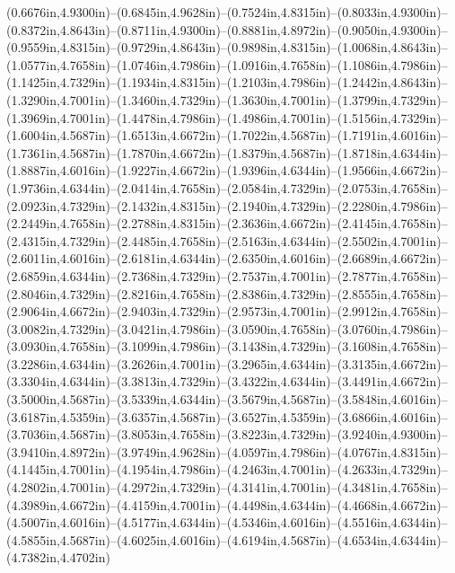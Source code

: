 (0.6676in,4.9300in)--(0.6845in,4.9628in)--(0.7524in,4.8315in)--(0.8033in,4.9300in)--(0.8372in,4.8643in)--(0.8711in,4.9300in)--(0.8881in,4.8972in)--(0.9050in,4.9300in)--(0.9559in,4.8315in)--(0.9729in,4.8643in)--(0.9898in,4.8315in)--(1.0068in,4.8643in)--(1.0577in,4.7658in)--(1.0746in,4.7986in)--(1.0916in,4.7658in)--(1.1086in,4.7986in)--(1.1425in,4.7329in)--(1.1934in,4.8315in)--(1.2103in,4.7986in)--(1.2442in,4.8643in)--(1.3290in,4.7001in)--(1.3460in,4.7329in)--(1.3630in,4.7001in)--(1.3799in,4.7329in)--(1.3969in,4.7001in)--(1.4478in,4.7986in)--(1.4986in,4.7001in)--(1.5156in,4.7329in)--(1.6004in,4.5687in)--(1.6513in,4.6672in)--(1.7022in,4.5687in)--(1.7191in,4.6016in)--(1.7361in,4.5687in)--(1.7870in,4.6672in)--(1.8379in,4.5687in)--(1.8718in,4.6344in)--(1.8887in,4.6016in)--(1.9227in,4.6672in)--(1.9396in,4.6344in)--(1.9566in,4.6672in)--(1.9736in,4.6344in)--(2.0414in,4.7658in)--(2.0584in,4.7329in)--(2.0753in,4.7658in)--(2.0923in,4.7329in)--(2.1432in,4.8315in)--(2.1940in,4.7329in)--(2.2280in,4.7986in)--(2.2449in,4.7658in)--(2.2788in,4.8315in)--(2.3636in,4.6672in)--(2.4145in,4.7658in)--(2.4315in,4.7329in)--(2.4485in,4.7658in)--(2.5163in,4.6344in)--(2.5502in,4.7001in)--(2.6011in,4.6016in)--(2.6181in,4.6344in)--(2.6350in,4.6016in)--(2.6689in,4.6672in)--(2.6859in,4.6344in)--(2.7368in,4.7329in)--(2.7537in,4.7001in)--(2.7877in,4.7658in)--(2.8046in,4.7329in)--(2.8216in,4.7658in)--(2.8386in,4.7329in)--(2.8555in,4.7658in)--(2.9064in,4.6672in)--(2.9403in,4.7329in)--(2.9573in,4.7001in)--(2.9912in,4.7658in)--(3.0082in,4.7329in)--(3.0421in,4.7986in)--(3.0590in,4.7658in)--(3.0760in,4.7986in)--(3.0930in,4.7658in)--(3.1099in,4.7986in)--(3.1438in,4.7329in)--(3.1608in,4.7658in)--(3.2286in,4.6344in)--(3.2626in,4.7001in)--(3.2965in,4.6344in)--(3.3135in,4.6672in)--(3.3304in,4.6344in)--(3.3813in,4.7329in)--(3.4322in,4.6344in)--(3.4491in,4.6672in)--(3.5000in,4.5687in)--(3.5339in,4.6344in)--(3.5679in,4.5687in)--(3.5848in,4.6016in)--(3.6187in,4.5359in)--(3.6357in,4.5687in)--(3.6527in,4.5359in)--(3.6866in,4.6016in)--(3.7036in,4.5687in)--(3.8053in,4.7658in)--(3.8223in,4.7329in)--(3.9240in,4.9300in)--(3.9410in,4.8972in)--(3.9749in,4.9628in)--(4.0597in,4.7986in)--(4.0767in,4.8315in)--(4.1445in,4.7001in)--(4.1954in,4.7986in)--(4.2463in,4.7001in)--(4.2633in,4.7329in)--(4.2802in,4.7001in)--(4.2972in,4.7329in)--(4.3141in,4.7001in)--(4.3481in,4.7658in)--(4.3989in,4.6672in)--(4.4159in,4.7001in)--(4.4498in,4.6344in)--(4.4668in,4.6672in)--(4.5007in,4.6016in)--(4.5177in,4.6344in)--(4.5346in,4.6016in)--(4.5516in,4.6344in)--(4.5855in,4.5687in)--(4.6025in,4.6016in)--(4.6194in,4.5687in)--(4.6534in,4.6344in)--(4.7382in,4.4702in)
